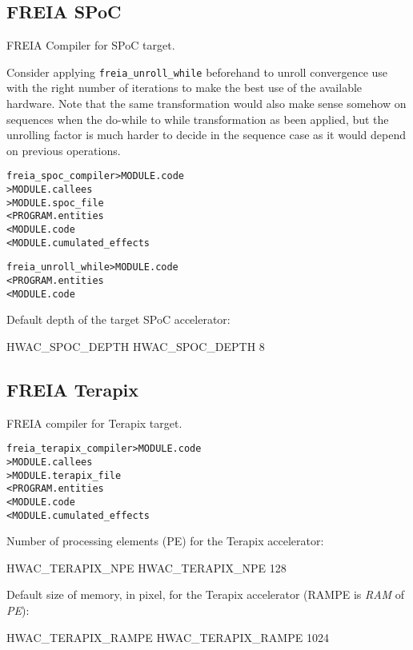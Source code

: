 \documentclass[a4paper]{report}
\newenvironment{PipsMake}{\begin{alltt}}{\end{alltt}}
\begin{document}
\subsection{FREIA SPoC}
\label{hwac-freia-spoc}

FREIA Compiler for SPoC target.

Consider applying  \verb|freia_unroll_while| beforehand to unroll convergence
use with the right number of iterations to make the best use of the available
hardware. Note that the same transformation would also make sense somehow
on sequences when the do-while to while transformation as been applied, but
the unrolling factor is much harder to decide in the sequence case as it would
depend on previous operations.

\begin{PipsMake}
freia_spoc_compiler   > MODULE.code
                      > MODULE.callees
                      > MODULE.spoc_file
        < PROGRAM.entities
        < MODULE.code
        < MODULE.cumulated_effects

freia_unroll_while	> MODULE.code
        < PROGRAM.entities
        < MODULE.code
\end{PipsMake}

Default depth of the target SPoC accelerator:
\begin{PipsProp}{HWAC_SPOC_DEPTH}
HWAC_SPOC_DEPTH 8
\end{PipsProp}

\subsection{FREIA Terapix}
\label{hwac-freia-terapix}

FREIA compiler for Terapix target.

\begin{PipsMake}
freia_terapix_compiler  > MODULE.code
                        > MODULE.callees
                        > MODULE.terapix_file
        < PROGRAM.entities
        < MODULE.code
        < MODULE.cumulated_effects
\end{PipsMake}

Number of processing elements (PE) for the Terapix accelerator:
\begin{PipsProp}{HWAC_TERAPIX_NPE}
HWAC_TERAPIX_NPE 128
\end{PipsProp}

Default size of memory, in pixel, for the Terapix accelerator
(RAMPE is \emph{RAM} of \emph{PE}):
\begin{PipsProp}{HWAC_TERAPIX_RAMPE}
HWAC_TERAPIX_RAMPE 1024
\end{PipsProp}
\end{document}
